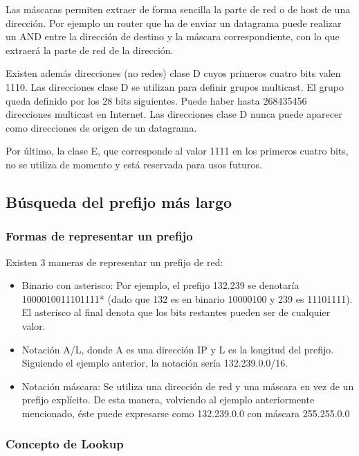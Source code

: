 Las máscaras permiten extraer de forma sencilla la parte de red o de host de una dirección. Por ejemplo un router que ha de enviar un datagrama puede realizar un AND entre la dirección de destino y la máscara correspondiente, con lo que extraerá la parte de red de la dirección.

Existen además direcciones (no redes) clase D cuyos primeros cuatro bits valen 1110. Las direcciones clase D se utilizan para definir grupos multicast. El grupo queda definido por los 28 bits siguientes. Puede haber hasta 268435456 direcciones multicast en Internet. Las direcciones clase D nunca puede aparecer como direcciones de origen de un datagrama.

Por último, la clase E, que corresponde al valor 1111 en los primeros cuatro bits, no se utiliza de momento y está reservada para usos futuros.



\subsection{Búsqueda del prefijo más largo}

\subsubsection{Formas de representar un prefijo}

Existen 3 maneras de representar un prefijo de red:

\begin{itemize}
	\item Binario con asterisco: Por ejemplo, el prefijo 132.239 se denotaría 1000010011101111* (dado que 132 es en binario 10000100 y 239 es 11101111). El asterisco al final denota que los bits restantes pueden ser de cualquier valor.
	\item Notación A/L, donde A es una dirección IP y L es la longitud del prefijo. Siguiendo el ejemplo anterior, la notación sería 132.239.0.0/16.
	\item Notación máscara: Se utiliza una dirección de red y una máscara en vez de un prefijo explícito. De esta manera, volviendo al ejemplo anteriormente mencionado, éste puede expresarse como 132.239.0.0 con máscara 255.255.0.0
\end{itemize}

\subsubsection{Concepto de Lookup}

